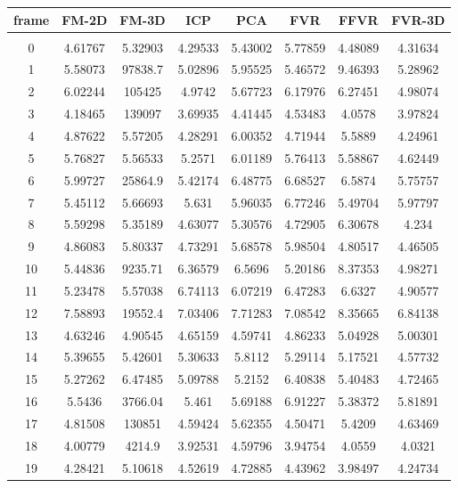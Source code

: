 \begin{center}
\begin{longtable}{cccccccc}
\hline
\textbf{frame} & \textbf{FM-2D} & \textbf{FM-3D} & \textbf{ICP} & \textbf{PCA} & \textbf{FVR} & \textbf{FFVR} & \textbf{FVR-3D} \\
\hline \\
0 & 4.61767 & 5.32903 & 4.29533 & 5.43002 & 5.77859 & 4.48089 & 4.31634\\
1 & 5.58073 & 97838.7 & 5.02896 & 5.95525 & 5.46572 & 9.46393 & 5.28962\\
2 & 6.02244 & 105425 & 4.9742 & 5.67723 & 6.17976 & 6.27451 & 4.98074\\
3 & 4.18465 & 139097 & 3.69935 & 4.41445 & 4.53483 & 4.0578 & 3.97824\\
4 & 4.87622 & 5.57205 & 4.28291 & 6.00352 & 4.71944 & 5.5889 & 4.24961\\
5 & 5.76827 & 5.56533 & 5.2571 & 6.01189 & 5.76413 & 5.58867 & 4.62449\\
6 & 5.99727 & 25864.9 & 5.42174 & 6.48775 & 6.68527 & 6.5874 & 5.75757\\
7 & 5.45112 & 5.66693 & 5.631 & 5.96035 & 6.77246 & 5.49704 & 5.97797\\
8 & 5.59298 & 5.35189 & 4.63077 & 5.30576 & 4.72905 & 6.30678 & 4.234\\
9 & 4.86083 & 5.80337 & 4.73291 & 5.68578 & 5.98504 & 4.80517 & 4.46505\\
10 & 5.44836 & 9235.71 & 6.36579 & 6.5696 & 5.20186 & 8.37353 & 4.98271\\
11 & 5.23478 & 5.57038 & 6.74113 & 6.07219 & 6.47283 & 6.6327 & 4.90577\\
12 & 7.58893 & 19552.4 & 7.03406 & 7.71283 & 7.08542 & 8.35665 & 6.84138\\
13 & 4.63246 & 4.90545 & 4.65159 & 4.59741 & 4.86233 & 5.04928 & 5.00301\\
14 & 5.39655 & 5.42601 & 5.30633 & 5.8112 & 5.29114 & 5.17521 & 4.57732\\
15 & 5.27262 & 6.47485 & 5.09788 & 5.2152 & 6.40838 & 5.40483 & 4.72465\\
16 & 5.5436 & 3766.04 & 5.461 & 5.69188 & 6.91227 & 5.38372 & 5.81891\\
17 & 4.81508 & 130851 & 4.59424 & 5.62355 & 4.50471 & 5.4209 & 4.63469\\
18 & 4.00779 & 4214.9 & 3.92531 & 4.59796 & 3.94754 & 4.0559 & 4.0321\\
19 & 4.28421 & 5.10618 & 4.52619 & 4.72885 & 4.43962 & 3.98497 & 4.24734\\

\end{longtable}
\end{center}
